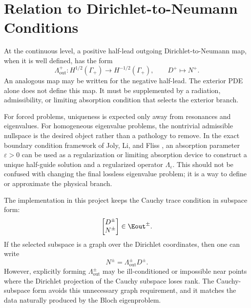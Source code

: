 %
%
%
%
%

\section{Relation to Dirichlet-to-Neumann Conditions}

At the continuous level, a positive half-lead outgoing Dirichlet-to-Neumann map,
when it is well defined, has the form
\[
  \Lambda_{\mathrm{out}}^+:
  H^{1/2}(\Gamma_+)\to H^{-1/2}(\Gamma_+),
  \qquad
  D^+\mapsto N^+ .
\]
An analogous map may be written for the negative half-lead.  The exterior PDE
alone does not define this map.  It must be supplemented by a radiation,
admissibility, or limiting absorption condition that selects the exterior
branch.

For forced problems, uniqueness is expected only away from resonances and
eigenvalues.  For homogeneous eigenvalue problems, the nontrivial admissible
nullspace is the desired object rather than a pathology to remove.  In the exact
boundary condition framework of Joly, Li, and Fliss \cite{JolyLiFliss2006}, an
absorption parameter \(\varepsilon>0\) can be used as a regularization or
limiting absorption device to construct a unique half-guide solution and a
regularized operator \(\Lambda_\varepsilon\).  This should not be confused with
changing the final lossless eigenvalue problem; it is a way to define or
approximate the physical branch.

The implementation in this project keeps the Cauchy trace condition in subspace
form:
\[
  \begin{bmatrix}
  D^\pm\\
  N^\pm
  \end{bmatrix}
  \in
  \Eout^\pm .
\]
If the selected subspace is a graph over the Dirichlet coordinates, then one can
write
\[
  N^\pm=\Lambda_{\mathrm{out}}^\pm D^\pm .
\]
However, explicitly forming \(\Lambda_{\mathrm{out}}^\pm\) may be ill-conditioned
or impossible near points where the Dirichlet projection of the Cauchy subspace
loses rank.  The Cauchy-subspace form avoids this unnecessary graph
requirement, and it matches the data naturally produced by the Bloch
eigenproblem.
